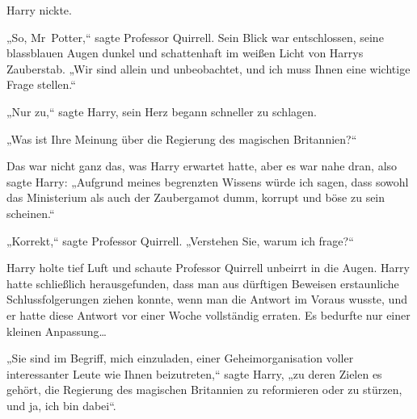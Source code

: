 Harry nickte.

„So, Mr~Potter,“ sagte Professor Quirrell. Sein Blick war entschlossen, seine blassblauen Augen dunkel und schattenhaft im weißen Licht von Harrys Zauberstab. „Wir sind allein und unbeobachtet, und ich muss Ihnen eine wichtige Frage stellen.“

„Nur zu,“ sagte Harry, sein Herz begann schneller zu schlagen.

„Was ist Ihre Meinung über die Regierung des magischen Britannien?“

Das war nicht ganz das, was Harry erwartet hatte, aber es war nahe dran, also sagte Harry: „Aufgrund meines begrenzten Wissens würde ich sagen, dass sowohl das Ministerium als auch der Zaubergamot dumm, korrupt und böse zu sein scheinen.“

„Korrekt,“ sagte Professor Quirrell. „Verstehen Sie, warum ich frage?“

Harry holte tief Luft und schaute Professor Quirrell unbeirrt in die Augen. Harry hatte schließlich herausgefunden, dass man aus dürftigen Beweisen erstaunliche Schlussfolgerungen ziehen konnte, wenn man die Antwort im Voraus wusste, und er hatte diese Antwort vor einer Woche vollständig erraten. Es bedurfte nur einer kleinen Anpassung…

„Sie sind im Begriff, mich einzuladen, einer Geheimorganisation voller interessanter Leute wie Ihnen beizutreten,“ sagte Harry, „zu deren Zielen es gehört, die Regierung des magischen Britannien zu reformieren oder zu stürzen, und ja, ich bin dabei“.

